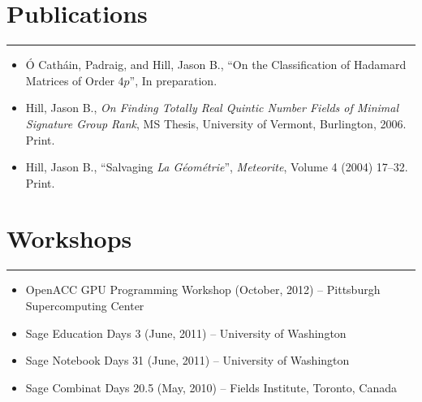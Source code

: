 \documentclass[letterpaper,10pt]{article}
\newcommand{\mblue}{\color{darkblue}}
\begin{document}
\section*{\mblue Publications}

\vspace{-2.15pc}
{\hfill\mblue\rule{5.64in}{0.02cm}}

\vspace{1pc}
\begin{itemize}
\item \'O Cath\'ain, Padraig, and Hill, Jason B., ``On the Classification of Hadamard Matrices of Order
$4p$'', In preparation.
\item Hill, Jason B., \textit{On Finding Totally Real Quintic Number Fields of Minimal Signature
Group Rank}, MS Thesis, University of Vermont, Burlington, 2006. Print.
\item Hill, Jason B., ``Salvaging \textit{La G\'eom\'etrie}'', \textit{Meteorite}, Volume 4 (2004)
17--32. Print.
\end{itemize}


\section*{\mblue Workshops}

\vspace{-2.15pc}
{\hfill\mblue\rule{5.76in}{0.02cm}}

\vspace{1pc}
\begin{itemize}
\item OpenACC GPU Programming Workshop (October, 2012) -- Pittsburgh Supercomputing Center
\item Sage Education Days 3 (June, 2011) -- University of Washington
\item Sage Notebook Days 31 (June, 2011) -- University of Washington
\item Sage Combinat Days 20.5 (May, 2010) -- Fields Institute, Toronto, Canada
\end{itemize}
\end{document}
